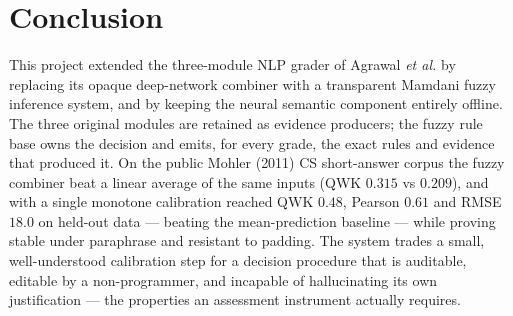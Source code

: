 \documentclass[11pt,a4paper]{article}
\begin{document}
\section{Conclusion}

This project extended the three-module NLP grader of Agrawal \emph{et al.}
\cite{agrawal2024} by replacing its opaque deep-network combiner with a
transparent Mamdani fuzzy inference system, and by keeping the neural semantic
component entirely offline. The three original modules are retained as evidence
producers; the fuzzy rule base owns the decision and emits, for every grade, the
exact rules and evidence that produced it. On the public Mohler (2011) CS
short-answer corpus the fuzzy combiner beat a linear average of the same inputs
(QWK $0.315$ vs $0.209$), and with a single monotone calibration reached QWK
$0.48$, Pearson $0.61$ and RMSE $18.0$ on held-out data --- beating the
mean-prediction baseline --- while proving stable under paraphrase and resistant to
padding. The system trades a small, well-understood calibration step for a
decision procedure that is auditable, editable by a non-programmer, and incapable
of hallucinating its own justification --- the properties an assessment
instrument actually requires.
\end{document}
